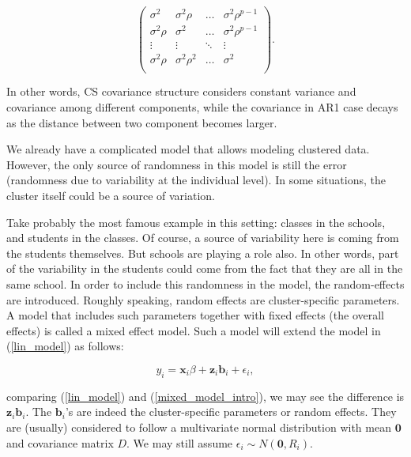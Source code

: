 \documentclass[11pt,a5paper,twoside]{book}
\begin{document}
\begin{equation}
\label{cov_ar1}
\left(
\begin{array}{cccc}
\sigma^2  & \sigma^2\rho & \ldots & \sigma^2\rho^{p-1} \\
\sigma^2\rho & \sigma^2  & \ldots & \sigma^2\rho^{p-1}  \\
\vdots & \vdots & \ddots & \vdots \\
\sigma^2\rho & \sigma^2\rho^2 & \ldots & \sigma^2  \\
\end{array} \right).
\end{equation}

In other words, CS covariance structure considers constant variance and covariance among different components, while the covariance in AR1 case decays as the distance between two component becomes larger. 

We already have a complicated model that allows modeling clustered data. However, the only source of randomness in this model is still the error (randomness due to variability at the individual level). In some situations, the cluster itself could be a source of variation. 

Take probably the most famous example in this setting: classes in the schools, and students in the classes. Of course, a source of variability here is coming from the students themselves. But schools are playing a role also. In other words, part of the variability in the students could come from the fact that they are all in the same school. In order to include this randomness in the model, the random-effects are introduced. Roughly speaking, random effects are cluster-specific parameters. A model that includes such parameters together with fixed effects (the overall effects) is called a mixed effect model. Such a model will extend the model in (\ref{lin_model}) as follows:

\begin{equation}
\label{mixed_model_intro}
y_i = \mathbf{x}_i \beta + \mathbf{z}_i \mathbf{b}_i + \epsilon_i,
\end{equation}

comparing (\ref{lin_model}) and (\ref{mixed_model_intro}), we may see the difference is $\mathbf{z}_i \mathbf{b}_i$. The $\mathbf{b}_i$'s are indeed the cluster-specific parameters or random effects. They are (usually) considered to follow a multivariate normal distribution with mean $\mathbf{0}$ and covariance matrix $D$. We may still assume $\epsilon_i \sim N(\mathbf{0}, R_i)$. 
\end{document}
